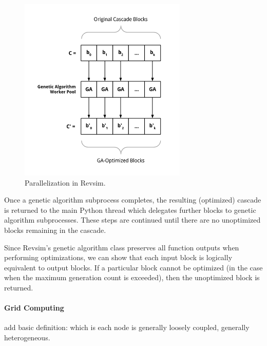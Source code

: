 \begin{figure}
  \begin{center}
    \includegraphics[width=80mm]{diagrams/parallelization.png}
  \end{center}
  \caption{Parallelization in Revsim.}
  \label{fig:parallel}
\end{figure}

Once a genetic algorithm subprocess completes, the resulting (optimized) cascade is returned to the main Python thread which delegates further blocks to genetic algorithm subprocesses. These steps are continued until there are no unoptimized blocks remaining in the cascade. 

Since Revsim's genetic algorithm class preserves all function outputs when performing optimizations, we can show that each input block is logically equivalent to output blocks. If a particular block cannot be optimized (in the case when the maximum generation count is exceeded), then the unoptimized block is returned.


\paragraph{Grid Computing}
add basic definition: which is each node is generally loosely coupled, generally heterogeneous.
